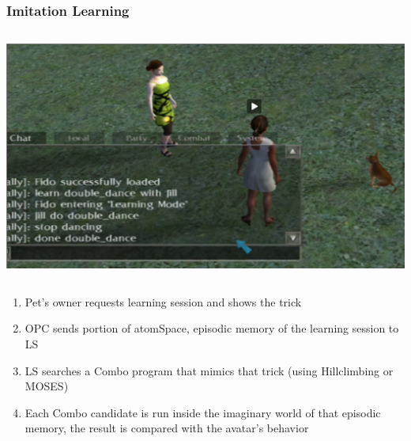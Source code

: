 \documentclass{beamer}
\begin{document}
\frame
{
  \frametitle{Imitation Learning}

  \begin{columns}

    \column{1.2in}
    \includegraphics[scale=0.15]{double_dance.png}
    
    \column{2in}
  \end{columns}

  \begin{enumerate}
  \item<+-> Pet's owner requests \alert{learning session and shows the trick}
  \item<+-> OPC sends portion of atomSpace, \alert{episodic memory of the
    learning session to LS}
  \item<+-> LS searches a \alert{Combo program that mimics that trick}
    (using Hillclimbing or MOSES)
  \item<+-> Each Combo candidate is \alert{run inside the imaginary world}
    of that episodic memory, the result is
    \alert{compared with the avatar's behavior}
  \end{enumerate}
  
}
\end{document}
